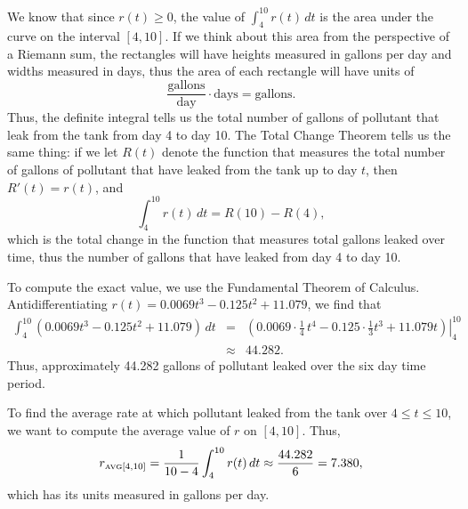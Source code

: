 We know that since $r(t) \ge 0$, the value of $\int_4^{10} r(t) \, dt$ is the area under the curve on the interval $[4,10]$.  If we think about this area from the perspective of a Riemann sum, the rectangles will have heights measured in gallons per day and widths measured in days, thus the area of each rectangle will have units of
$$\frac{\mbox{gallons}}{\mbox{day}} \cdot \mbox{days} = \mbox{gallons}.$$
Thus, the definite integral tells us the total number of gallons of pollutant that leak from the tank from day 4 to day 10.  The Total Change Theorem tells us the same thing:  if we let $R(t)$ denote the function that measures the total number of gallons of pollutant that have leaked from the tank up to day $t$, then $R'(t) = r(t)$, and 
$$\int_4^{10} r(t) \, dt = R(10) - R(4),$$
which is the total change in the function that measures total gallons leaked over time, thus the number of gallons that have leaked from day 4 to day 10.

To compute the exact value, we use the Fundamental Theorem of Calculus.  Antidifferentiating $r(t) = 0.0069t^3 -0.125t^2+11.079$, we find that
\begin{eqnarray*}
	\int_4^{10} (0.0069t^3 -0.125t^2+11.079) \, dt & = & \left. \left( 0.0069 \cdot \frac{1}{4} \, t^4 - 0.125 \cdot \frac{1}{3} t^3 + 11.079t \right) \right|_4^{10} \\
			& \approx & 44.282. 
\end{eqnarray*}
Thus, approximately 44.282 gallons of pollutant leaked over the six day time period.

To find the average rate at which pollutant leaked from the tank over $4 \le t \le 10$, we want to compute the average value of $r$ on $[4,10]$.  Thus,
$$r_{\mbox{\tiny{AVG}}[4,10]} = \frac{1}{10-4} \int_4^{10} r(t) \, dt \approx \frac{44.282}{6} = 7.380,$$
which has its units measured in gallons per day.
\afterex



